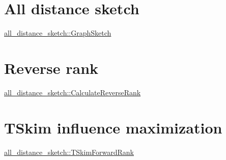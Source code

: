 \hypertarget{Overview_ADS}{}\section{All distance sketch}\label{Overview_ADS}
\hyperlink{classall__distance__sketch_1_1GraphSketch}{all\+\_\+distance\+\_\+sketch\+::\+Graph\+Sketch}\hypertarget{Overview_RRank}{}\section{Reverse rank}\label{Overview_RRank}
\hyperlink{namespaceall__distance__sketch_a025f777de5a9df1594dd306f9037f385}{all\+\_\+distance\+\_\+sketch\+::\+Calculate\+Reverse\+Rank}\hypertarget{Overview_TSkim}{}\section{T\+Skim influence maximization}\label{Overview_TSkim}
\hyperlink{classall__distance__sketch_1_1TSkimForwardRank}{all\+\_\+distance\+\_\+sketch\+::\+T\+Skim\+Forward\+Rank} 